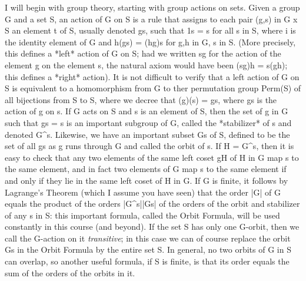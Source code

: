 I will begin with group theory, starting with group actions on sets.  Given a group G and a set S, an action of G on S is a rule that assigns to each pair (g,s) in G x S an element t of S, usually denoted gs, such that 1s = s for all s in S, where i is the identity element of G and h(gs) = (hg)s for g,h in G, s in S.  (More precisely, this defines a *left* action of G on S; had we written sg for the action of the element g on the element s, the natural axiom would have been (sg)h = s(gh); this defines a *right* action).  It is not difficult to verify that a left action of G on S is equivalent to a homomorphism \pi from G to ther permutation group Perm(S) of all bijections from S to S, where we decree that \pi(g)(s) = gs, where gs is the action of g on s.  If G acts on S and s is an element of S, then the set of g in G such that gs = s is an important subgroup of G, called the *stabilizer* of s and denoted G^s.  Likewise, we have an important subset Gs of S, defined to be the set of all gs as g runs through G and called the orbit of s.  If H = G^s, then it is easy to check that any two elements of the same left coset gH of H in G map s to the same element, and in fact two elements of G map s to the same element if and only if they lie in the same left coset of H in G.  If G is finite, it follows by Lagrange's Theorem (which I assume you have seen) that the order |G| of G equals the product of the orders |G^s||Gs| of the orders of the orbit and stabilizer of any s in S:  this important formula, called the Orbit Formula, will be used constantly in this course (and beyond).  If the set S has only one G-orbit, then we call the G-action on it {\sl transitive}; in this case we can of course replace the orbit Gs in the Orbit Formula by the entire set S.  In general, no two orbits of G in S can overlap, so another useful formula, if S is finite, is that its order equals the sum of the orders of the orbits in it.

